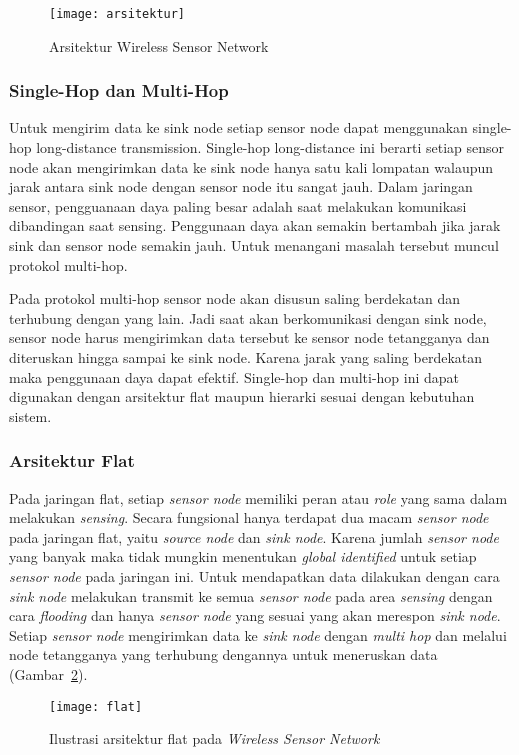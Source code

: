 \begin{figure} [H]
	\centering  
	\texttt{[image: arsitektur]}  
	\caption[Arsitektur Wireless Sensor Network]{Arsitektur Wireless Sensor Network} 
	\label{fig:arsitektur} 
\end{figure} 

\subsubsection{Single-Hop dan Multi-Hop}
Untuk mengirim data ke sink node setiap sensor node dapat menggunakan single-hop long-distance transmission. Single-hop long-distance ini berarti setiap sensor node akan mengirimkan data ke sink node hanya satu kali lompatan walaupun jarak antara sink node dengan sensor node itu sangat jauh. Dalam jaringan sensor, pengguanaan daya paling besar adalah saat melakukan komunikasi dibandingan saat sensing. Penggunaan daya akan semakin bertambah jika jarak sink dan sensor node semakin jauh. Untuk menangani masalah tersebut muncul protokol multi-hop.

Pada protokol multi-hop sensor node akan disusun saling berdekatan dan terhubung dengan yang lain. Jadi saat akan berkomunikasi dengan sink node, sensor node harus mengirimkan data tersebut ke sensor node tetangganya dan diteruskan hingga sampai ke sink node. Karena jarak yang saling berdekatan maka penggunaan daya dapat efektif. Single-hop dan multi-hop ini dapat digunakan dengan arsitektur flat maupun hierarki sesuai dengan kebutuhan sistem.

\subsubsection{Arsitektur Flat}
Pada jaringan flat, setiap \textit{sensor node} memiliki peran atau \textit{role} yang sama dalam melakukan \textit{sensing}. Secara fungsional hanya terdapat dua macam \textit{sensor node} pada jaringan flat, yaitu \textit{source node} dan \textit{sink node}. Karena jumlah \textit{sensor node} yang banyak maka tidak mungkin menentukan \textit{global identified} untuk setiap \textit{sensor node} pada jaringan ini. Untuk mendapatkan data dilakukan dengan cara \textit{sink node} melakukan transmit ke semua \textit{sensor node} pada area \textit{sensing} dengan cara \textit{flooding} dan hanya \textit{sensor node} yang sesuai yang akan merespon \textit{sink node}. Setiap \textit{sensor node} mengirimkan data ke \textit{sink node} dengan \textit{multi hop} dan melalui node tetangganya yang terhubung dengannya untuk meneruskan data (Gambar~\ref{fig:flat}).
\begin{figure} [H]
	\centering  
	\texttt{[image: flat]}  
	\caption[Ilustrasi arsitektur flat pada \textit{Wireless Sensor Network}]{Ilustrasi arsitektur flat pada \textit{Wireless Sensor Network}} 
	\label{fig:flat} 
\end{figure} 

